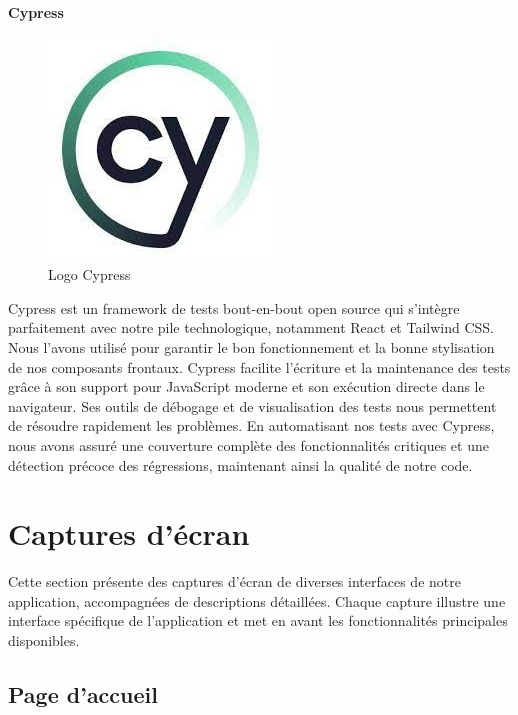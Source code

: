 \large
\textbf{Cypress}
\begin{figure}[htbp]
   \centering
   \includegraphics[scale=0.6]{Images/cy.jpg} 
   \caption{Logo Cypress\cite{Cypress}}
   \label{fig:cypress}
\end{figure}

Cypress est un framework de tests bout-en-bout open source qui 
s'intègre parfaitement avec notre pile technologique, notamment 
React et Tailwind CSS. Nous l'avons utilisé pour garantir le bon 
fonctionnement et la bonne stylisation de nos composants 
frontaux. Cypress facilite l'écriture et la maintenance des 
tests grâce à son support pour JavaScript moderne et son 
exécution directe dans le navigateur. Ses outils de débogage 
et de visualisation des tests nous permettent de résoudre 
rapidement les problèmes\cite{Cypress}. En automatisant nos tests avec Cypress, 
nous avons assuré une couverture complète des fonctionnalités 
critiques et une détection précoce des régressions, maintenant 
ainsi la qualité de notre code.

\section{Captures d'écran}
Cette section présente des captures d'écran de diverses interfaces de notre application, 
accompagnées de descriptions  détaillées.  Chaque  capture  illustre une interface 
spécifique de l'application et met en avant les fonctionnalités principales disponibles. 
\subsection{Page d'accueil}

